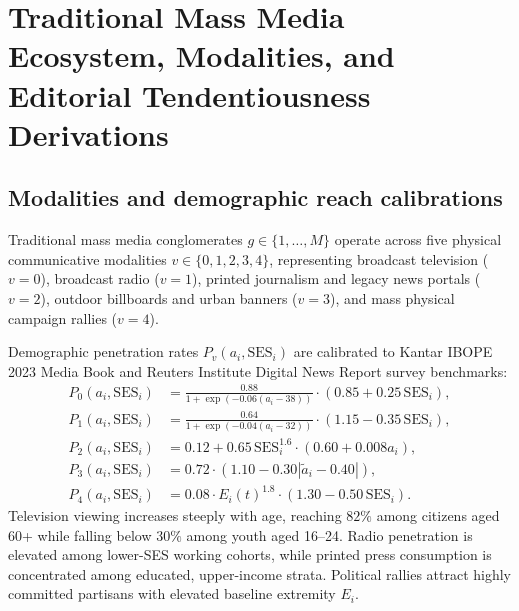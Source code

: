 \documentclass[11pt,a4paper]{article}
\begin{document}
\section{Traditional Mass Media Ecosystem, Modalities, and Editorial Tendentiousness Derivations}
\label{snote:traditional_media_ecosystem}

\subsection{Modalities and demographic reach calibrations}
\label{sssec:media_modalities}
Traditional mass media conglomerates $g \in \{1, \dots, M\}$ operate across five physical communicative modalities $v \in \{0, 1, 2, 3, 4\}$, representing broadcast television ($v=0$), broadcast radio ($v=1$), printed journalism and legacy news portals ($v=2$), outdoor billboards and urban banners ($v=3$), and mass physical campaign rallies ($v=4$).

Demographic penetration rates $P_v(a_i, \mathrm{SES}_i)$ are calibrated to Kantar IBOPE 2023 Media Book and Reuters Institute Digital News Report survey benchmarks:
\begin{align}
    P_0(a_i, \mathrm{SES}_i) &= \frac{0.88}{1 + \exp(-0.06(a_i - 38))} \cdot (0.85 + 0.25\,\mathrm{SES}_i), \label{eq:reach_tv} \\
    P_1(a_i, \mathrm{SES}_i) &= \frac{0.64}{1 + \exp(-0.04(a_i - 32))} \cdot (1.15 - 0.35\,\mathrm{SES}_i), \label{eq:reach_radio} \\
    P_2(a_i, \mathrm{SES}_i) &= 0.12 + 0.65\,\mathrm{SES}_i^{1.6} \cdot (0.60 + 0.008 a_i), \label{eq:reach_press} \\
    P_3(a_i, \mathrm{SES}_i) &= 0.72 \cdot (1.10 - 0.30|\tilde{a}_i - 0.40|), \label{eq:reach_outdoor} \\
    P_4(a_i, \mathrm{SES}_i) &= 0.08 \cdot E_i(t)^{1.8} \cdot (1.30 - 0.50\,\mathrm{SES}_i). \label{eq:reach_rally}
\end{align}
Television viewing increases steeply with age, reaching $82\%$ among citizens aged 60+ while falling below $30\%$ among youth aged 16--24. Radio penetration is elevated among lower-SES working cohorts, while printed press consumption is concentrated among educated, upper-income strata. Political rallies attract highly committed partisans with elevated baseline extremity $E_i$.
\end{document}
